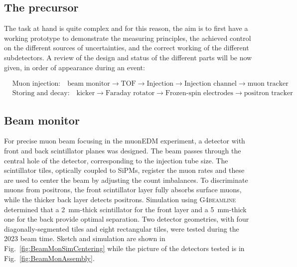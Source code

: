 \begin{refsection}
\section{The precursor}
    The task at hand is quite complex and for this reason, the aim is to first have a working prototype to demonstrate the measuring principles, the achieved control on the different sources of uncertainties, and the correct working of the different subdetectors.
    A review of the design and status of the different parts will be now given, in order of appearance during an event:
    \begin{center}
        \vspace*{-3em} %
        \begin{align*}
        &\text{Muon injection:} \quad \text{beam monitor} \rightarrow \text{TOF} \rightarrow \text{Injection} \rightarrow \text{Injection channel} \rightarrow \text{muon tracker} \\
        &\text{Storing and decay:} \quad \text{kicker} \rightarrow \text{Faraday rotator} \rightarrow \text{Frozen-spin electrodes} \rightarrow \text{positron tracker}
        \end{align*}
        \vspace*{-3em} %
    \end{center}
    
    \subsection{Beam monitor}
        For precise muon beam focusing in the muonEDM experiment, a detector with front and back scintillator planes was designed. 
        The beam passes through the central hole of the detector, corresponding to the injection tube size. 
        The scintillator tiles, optically coupled to SiPMs, register the muon rates and these are used to center the beam by adjusting the count imbalances.
        To discriminate muons from positrons, the front scintillator layer fully absorbs surface muons, while the thicker back layer detects positrons.
        Simulation using \textsc{G4beamline} determined that a \SI{2}{mm}-thick scintillator for the front layer and a \SI{5}{mm}-thick one for the back provide optimal separation.
        Two detector geometries, with four diagonally-segmented tiles and eight rectangular tiles, were tested during the 2023 beam time.
        Sketch and simulation are shown in Fig.~\ref{fig:BeamMonSimCentering} while the picture of the detectors tested is in Fig.~\ref{fig:BeamMonAssembly}.


\end{refsection}
